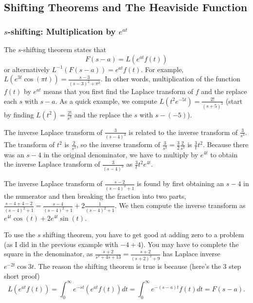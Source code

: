 \subsection{Shifting Theorems and The Heaviside Function}

\subsubsection{$s$-shifting: Multiplication by $e^{at}$}

The $s$-shifting theorem states that $$F(s-a) = L(e^{at}f(t))$$ or alternatively $L^{-1}(F(s-a)) = e^{at}f(t)$. For example, $L(e^{3t}\cos(\pi t)) = \frac{s-3}{(s-3)^2+\pi^2}$. In other words, multiplication of the function $f(t)$ by $e^{at}$ means that you first find the Laplace transform of $f$ and the replace each $s$ with $s-a$. As a quick example, we compute $L(t^2e^{-5t}) = \frac{2!}{(s+5)^3}$ (start by finding $L(t^2)=\frac{2!}{s^3}$ and the replace the $s$ with $s-(-5)$).

The inverse Laplace transform of $\frac{3}{(s-4)^3}$ is related to the inverse transform of $\frac{3}{s^3}$. The transform of $t^2$ is $\frac{2}{s^3}$, so the inverse transform of $\frac{3}{s^3}=\frac{3}{2}\frac{2}{s^3}$ is $\frac{3}{t}t^2$.  Because there was an $s-4$ in the original denominator, we have to multiply by $e^{4t}$ to obtain the inverse Laplace transform of $\frac{3}{(s-4)^3}$ as $\frac{3}{t}t^2e^{4t}$.  

The inverse Laplace transform of $\frac{s-2}{(s-4)^2+1}$ is found by first obtaining an $s-4$ in the numerator and then breaking the fraction into two parts, $\frac{s-4+4-2}{(s-4)^2+1} = \frac{s-4}{(s-4)^2+1}+2\frac{1}{(s-4)^2+1}$. We then compute the inverse transform as $e^{4t}\cos(t) + 2e^{4t}\sin(t)$.  

To use the $s$ shifting theorem, you have to get good at adding zero to a problem (as I did in the previous example with $-4+4$). You may have to complete the square in the denominator, as $\frac{s+2}{s^2+4s+13} = \frac{s+2}{(s+2)^2+9}$ has Laplace inverse $e^{-2t}\cos 3t$. The reason the shifting theorem is true is because (here's the 3 step short proof) $$ L(e^{at}f(t)) = \int_0^\infty e^{-st}(e^{at}f(t))dt = \int_0^\infty e^{-(s-a)t}f(t)dt = F(s-a).$$ 


